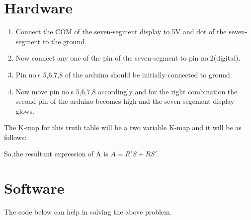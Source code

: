 \documentclass[12pt]{article}
\begin{document}
\section{Hardware}
	\begin{enumerate}
\item Connect the COM of the seven-segment display to 5V and dot of the seven-segment to the ground.
\item Now connect any one of the pin of the seven-segment to pin no.2(digital).
\item Pin no.s 5,6,7,8 of the arduino should be initially connected to ground.
\item Now move pin no.s 5,6,7,8 accordingly and for the right combination the second pin of the arduino becomes high and the seven segement display glows.
\end{enumerate}
\begin{center}
	
\end{center}
The K-map for this truth table will be a two variable K-map and it will be as follows:
	

So,the resultant expression of A is $A = R'S + RS'$.
\pagebreak
\section{Software}

The code below can help in solving the above problem.

\end{document}
